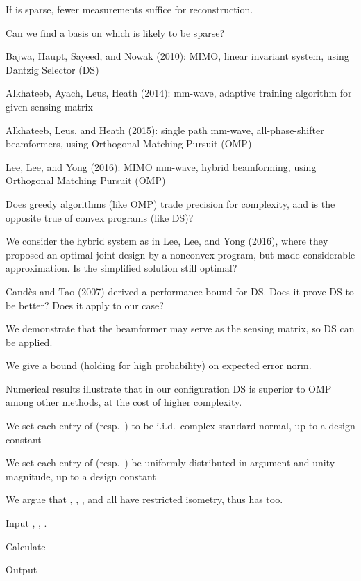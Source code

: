 {
\blank [big]

\I If  is sparse, fewer measurements suffice for reconstruction.

\I Can we find a basis on which  is likely to be sparse?
}
{
\I Bajwa, Haupt, Sayeed, and Nowak (2010): MIMO, linear invariant system, using Dantzig Selector (DS)

\I Alkhateeb, Ayach, Leus, Heath (2014): mm-wave, adaptive training algorithm for given sensing matrix

\I Alkhateeb, Leus, and Heath (2015): single path mm-wave, all-phase-shifter beamformers, using Orthogonal Matching Pursuit (OMP)

\I Lee, Lee, and Yong (2016): MIMO mm-wave, hybrid beamforming, using Orthogonal Matching Pursuit (OMP)
}
{
\I Does greedy algorithms (like OMP) trade precision for complexity, and is the opposite true of convex programs (like DS)?

\I We consider the hybrid system as in Lee, Lee, and Yong (2016), where they proposed an optimal joint design by a nonconvex program, but made considerable approximation.
Is the simplified solution still optimal?

\I Candès and Tao (2007) derived a performance bound for DS.
Does it prove DS to be better?
Does it apply to our case?
}
{
\I We demonstrate that the beamformer may serve as the sensing matrix, so DS can be applied.

\I We give a bound (holding for high probability) on expected error norm.

\I Numerical results illustrate that in our configuration DS is superior to OMP among other methods, at the cost of higher complexity.
}
{
\I We set each entry of  (resp.\ ) to be i.i.d.\ complex standard normal, up to a design constant

\I We set each entry of  (resp.\ ) be uniformly distributed in argument and unity magnitude, up to a design constant

\I We argue that , , , and  all have restricted isometry, thus  has too.
}
{
\I Input , , .

\I Calculate

\I Output 
}


